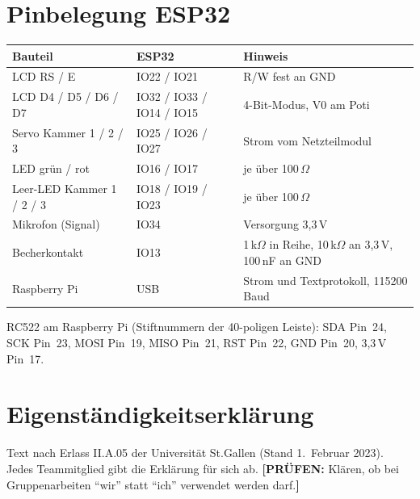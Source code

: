 \documentclass[11pt,a4paper]{article}
\newcommand{\pruefen}[1]{\textcolor{orange!85!black}{\textbf{[PRÜFEN:} #1\textbf{]}}}
\begin{document}
\section{Pinbelegung ESP32}
\label{sec:pins}

\begin{table}[H]
\centering
\small
\begin{tabularx}{\linewidth}{@{}l l Y@{}}
\toprule
\textbf{Bauteil} & \textbf{ESP32} & \textbf{Hinweis} \\
\midrule
LCD RS / E & IO22 / IO21 & R/W fest an GND \\
LCD D4 / D5 / D6 / D7 & IO32 / IO33 / IO14 / IO15 & 4-Bit-Modus, V0 am Poti \\
Servo Kammer 1 / 2 / 3 & IO25 / IO26 / IO27 & Strom vom Netzteilmodul \\
LED grün / rot & IO16 / IO17 & je über 100\,$\Omega$ \\
Leer-LED Kammer 1 / 2 / 3 & IO18 / IO19 / IO23 & je über 100\,$\Omega$ \\
Mikrofon (Signal) & IO34 & Versorgung 3,3\,V \\
Becherkontakt & IO13 & 1\,k$\Omega$ in Reihe, 10\,k$\Omega$ an 3,3\,V, 100\,nF an GND \\
Raspberry Pi & USB & Strom und Textprotokoll, 115200 Baud \\
\bottomrule
\end{tabularx}
\end{table}

RC522 am Raspberry Pi (Stiftnummern der 40-poligen Leiste): SDA Pin~24, SCK Pin~23, MOSI Pin~19, MISO Pin~21,
RST Pin~22, GND Pin~20, 3,3\,V Pin~17.

\newpage
\section*{Eigenständigkeitserklärung}

\small
Text nach Erlass II.A.05 der Universität St.Gallen (Stand 1.~Februar 2023). Jedes Teammitglied gibt die
Erklärung für sich ab.
\pruefen{Klären, ob bei Gruppenarbeiten \enquote{wir} statt \enquote{ich} verwendet werden darf.}
\end{document}
